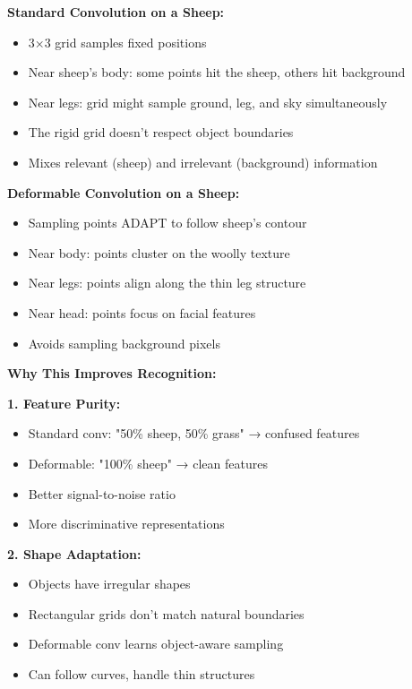 \documentclass[12pt]{article}
\newcommand{\explanation}[1]{{\color{explanationcolor}#1}}
\begin{document}
\begin{enumerate}[(a)]
{{    \textbf{Standard Convolution on a Sheep:}
    \begin{itemize}
        \item 3×3 grid samples fixed positions
        \item Near sheep's body: some points hit the sheep, others hit background
        \item Near legs: grid might sample ground, leg, and sky simultaneously
        \item The rigid grid doesn't respect object boundaries
        \item Mixes relevant (sheep) and irrelevant (background) information
    \end{itemize}
    
    \textbf{Deformable Convolution on a Sheep:}
    \begin{itemize}
        \item Sampling points ADAPT to follow sheep's contour
        \item Near body: points cluster on the woolly texture
        \item Near legs: points align along the thin leg structure
        \item Near head: points focus on facial features
        \item Avoids sampling background pixels
    \end{itemize}
    }
    
    \textbf{Why This Improves Recognition:}
    
    \explanation{
    \textbf{1. Feature Purity:}
    \begin{itemize}
        \item Standard conv: "50\% sheep, 50\% grass" → confused features
        \item Deformable: "100\% sheep" → clean features
        \item Better signal-to-noise ratio
        \item More discriminative representations
    \end{itemize}
    
    \textbf{2. Shape Adaptation:}
    \begin{itemize}
        \item Objects have irregular shapes
        \item Rectangular grids don't match natural boundaries
        \item Deformable conv learns object-aware sampling
        \item Can follow curves, handle thin structures
    \end{itemize}
    
}}
\end{enumerate}
\end{document}
